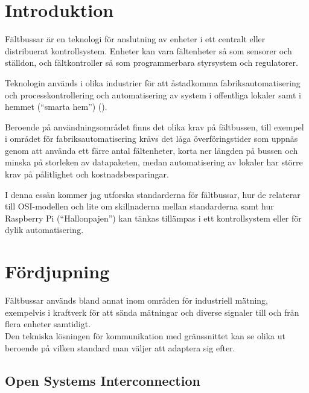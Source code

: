 \documentclass[a4paper,12pt]{article}
\title{\articlename}
\author{\authorname}
\begin{document}
\maketitle
{}
\thispagestyle{empty}
\clearpage


\begin{multicols}{2}

\section{Introduktion}

Fältbussar är en teknologi för anslutning av enheter i ett centralt eller distribuerat kontrollsystem. Enheter kan vara fältenheter så som sensorer och ställdon, och fältkontroller så som programmerbara styrsystem och regulatorer.

Teknologin används i olika industrier för att åstadkomma fabriksautomatisering och processkontrollering och automatisering av system i offentliga lokaler samt i hemmet (\enquote{smarta hem}) (\cite[s. 22-25]{distributedfieldbuscontrolnetworksystems}).

Beroende på användningsområdet finns det olika krav på fältbussen, till exempel i området för fabriksautomatisering krävs det låga överföringstider som uppnås genom att använda ett färre antal fältenheter, korta ner längden på bussen och minska på storleken av datapaketen, medan automatisering av lokaler har större krav på pålitlighet och kostnadsbesparingar.

I denna essän kommer jag utforska standarderna för fältbussar, hur de relaterar till OSI-modellen och lite om skillnaderna mellan standarderna samt hur Raspberry Pi (\enquote{Hallonpajen}) kan tänkas tillämpas i ett kontrollsystem eller för dylik automatisering.

\section{Fördjupning}

Fältbussar används bland annat inom områden för industriell mätning, exempelvis i kraftverk för att sända mätningar och diverse signaler till och från flera enheter samtidigt.\\
Den tekniska lösningen för kommunikation med gränssnittet kan se olika ut beroende på vilken standard man väljer att adaptera sig efter.

\subsection{Open Systems Interconnection}


\end{multicols}
\end{document}
